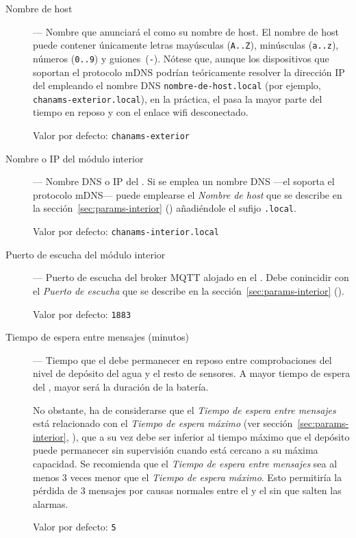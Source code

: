 \begin{description}

  \item[Nombre de host] --- Nombre que anunciará el \MEE como su nombre de host. El nombre de host puede contener únicamente letras mayúsculas (\texttt{A..Z}), minúsculas (\texttt{a..z}), números (\texttt{0..9}) y \mbox{guiones~(\texttt{-})}. Nótese que, aunque los dispositivos que soportan el protocolo mDNS podrían teóricamente resolver la dirección IP del \ME empleando el nombre DNS \texttt{nombre-de-host\allowbreak.\allowbreak\-lo\-cal} (por ejemplo, \texttt{chanams-exterior.local}), en la práctica, el \ME pasa la mayor parte del tiempo en reposo y con el enlace wifi desconectado.
  
  Valor por defecto: \texttt{chanams-exterior}
  
  \item[Nombre o IP del módulo interior] --- Nombre DNS o IP del \MIE. Si se emplea un nombre DNS ---el \MEE soporta el protocolo mDNS--- puede emplearse el \emph{Nombre de host} que se describe en la sección~\ref{sec:params-interior} (\textit{}) añadiéndole el sufijo \texttt{.local}.
  
  Valor por defecto: \texttt{chanams-interior.local}
  
  \item[Puerto de escucha del módulo interior] --- Puerto de escucha del broker MQTT alojado en el \MIE. Debe conincidir con el \emph{Puerto de escucha} que se describe en la sección~\ref{sec:params-interior} (\textit{}).

  Valor por defecto: \texttt{1883}
  
  \item[Tiempo de espera entre mensajes (minutos)] --- Tiempo que el \MEE debe permanecer en reposo entre comprobaciones del nivel de depósito del agua y el resto de sensores. A mayor tiempo de espera del \ME, mayor será la duración de la batería.
  
  No obstante, ha de considerarse que el \emph{Tiempo de espera entre mensajes} está relacionado con el \emph{Tiempo de espera máximo} (ver sección~\ref{sec:params-interior}, \textit{}), que a su vez debe ser inferior al tiempo máximo que el depósito puede permanecer sin supervisión cuando está cercano a su máxima capacidad. Se recomienda que el \emph{Tiempo de espera entre mensajes} sea al menos 3 veces menor que el \emph{Tiempo de espera máximo}. Esto permitiría la pérdida de 3 mensajes por causas normales entre el \ME y el \MI sin que salten las alarmas. 

  Valor por defecto: \texttt{5}
   
\end{description}


